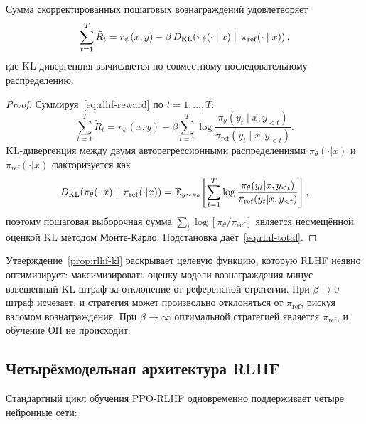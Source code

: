\begin{proposition}
\label{prop:rlhf-kl}
Сумма скорректированных пошаговых вознаграждений удовлетворяет
\begin{equation}
\label{eq:rlhf-total}
\sum_{t=1}^T \tilde{R}_t
= r_\psi(x, y)
  - \beta\,D_{\mathrm{KL}}\!\left(\pi_\theta(\cdot \mid x)\;\|\;\pi_{\mathrm{ref}}(\cdot \mid x)\right),
\end{equation}
где KL-дивергенция вычисляется по совместному последовательному распределению.
\end{proposition}

\begin{proof}
Суммируя~\eqref{eq:rlhf-reward} по $t = 1, \ldots, T$:
\[
\sum_{t=1}^T \tilde{R}_t
= r_\psi(x,y)
  - \beta\sum_{t=1}^T
    \log\frac{\pi_\theta(y_t \mid x, y_{<t})}
             {\pi_{\mathrm{ref}}(y_t \mid x, y_{<t})}.
\]
KL-дивергенция между двумя авторегрессионными распределениями $\pi_\theta(\cdot|x)$ и $\pi_{\mathrm{ref}}(\cdot|x)$ факторизуется как
\[
D_{\mathrm{KL}}\!\left(\pi_\theta(\cdot|x)\;\|\;\pi_{\mathrm{ref}}(\cdot|x)\right)
= \operatorname{\mathbb{E}}_{y \sim \pi_\theta}\!\left[
  \sum_{t=1}^T \log\frac{\pi_\theta(y_t|x,y_{<t})}
                         {\pi_{\mathrm{ref}}(y_t|x,y_{<t})}
\right],
\]
поэтому пошаговая выборочная сумма $\sum_t \log[\pi_\theta/\pi_{\mathrm{ref}}]$ является несмещённой оценкой KL методом Монте-Карло. Подстановка даёт~\eqref{eq:rlhf-total}.
\end{proof}

Утверждение~\ref{prop:rlhf-kl} раскрывает целевую функцию, которую RLHF неявно оптимизирует: максимизировать оценку модели вознаграждения минус взвешенный KL-штраф за отклонение от референсной стратегии. При $\beta \to 0$ штраф исчезает, и стратегия может произвольно отклоняться от $\pi_{\mathrm{ref}}$, рискуя взломом вознаграждения. При $\beta \to \infty$ оптимальной стратегией является $\pi_{\mathrm{ref}}$, и обучение ОП не происходит.

\subsection{Четырёхмодельная архитектура RLHF}

Стандартный цикл обучения PPO-RLHF одновременно поддерживает четыре нейронные сети:

